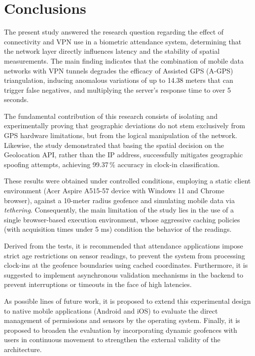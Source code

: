 \documentclass[runningheads]{llncs}
\begin{document}
\section{Conclusions}

The present study answered the research question regarding the effect of connectivity and VPN use in a biometric attendance system, determining that the network layer directly influences latency and the stability of spatial measurements. The main finding indicates that the combination of mobile data networks with VPN tunnels degrades the efficacy of Assisted GPS (A-GPS) triangulation, inducing anomalous variations of up to 14.38 meters that can trigger false negatives, and multiplying the server's response time to over 5 seconds.  

The fundamental contribution of this research consists of isolating and experimentally proving that geographic deviations do not stem exclusively from GPS hardware limitations, but from the logical manipulation of the network. Likewise, the study demonstrated that basing the spatial decision on the Geolocation API, rather than the IP address, successfully mitigates geographic spoofing attempts, achieving 99.37\,\% accuracy in clock-in classification. 

These results were obtained under controlled conditions, employing a static client environment (Acer Aspire A515-57 device with Windows 11 and Chrome browser), against a 10-meter radius geofence and simulating mobile data via \textit{tethering}. Consequently, the main limitation of the study lies in the use of a single browser-based execution environment, whose aggressive caching policies (with acquisition times under 5 ms) condition the behavior of the readings.  

Derived from the tests, it is recommended that attendance applications impose strict age restrictions on sensor readings, to prevent the system from processing clock-ins at the geofence boundaries using cached coordinates. Furthermore, it is suggested to implement asynchronous validation mechanisms in the backend to prevent interruptions or timeouts in the face of high latencies.  

As possible lines of future work, it is proposed to extend this experimental design to native mobile applications (Android and iOS) to evaluate the direct management of permissions and sensors by the operating system. Finally, it is proposed to broaden the evaluation by incorporating dynamic geofences with users in continuous movement to strengthen the external validity of the architecture.
\end{document}
